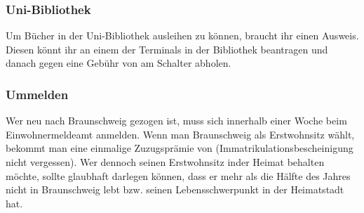 \subsubsection{Uni-Bibliothek}

Um B\"ucher in der Uni-Bibliothek ausleihen zu k\"onnen, braucht ihr
einen Ausweis. Diesen k\"onnt ihr an einem der Terminals in der
Bibliothek beantragen und danach gegen eine Geb\"uhr von \unit[5]{\EUR}{}
am Schalter abholen.

\subsubsection{Ummelden}

Wer neu nach Braunschweig gezogen ist, muss sich innerhalb einer
Woche beim Einwohnermeldeamt anmelden. Wenn man Braunschweig als
Erstwohnsitz w\"ahlt, bekommt man eine einmalige Zuzugspr\"amie von
\unit[200]{\EUR}{} (Immatrikulationsbescheinigung nicht vergessen). Wer
dennoch seinen Erstwohnsitz inder Heimat behalten m\"ochte, sollte
glaubhaft darlegen k\"onnen, dass er mehr als die H\"alfte des Jahres
nicht in Braunschweig lebt bzw. seinen Lebensschwerpunkt in der
Heimatstadt hat.

